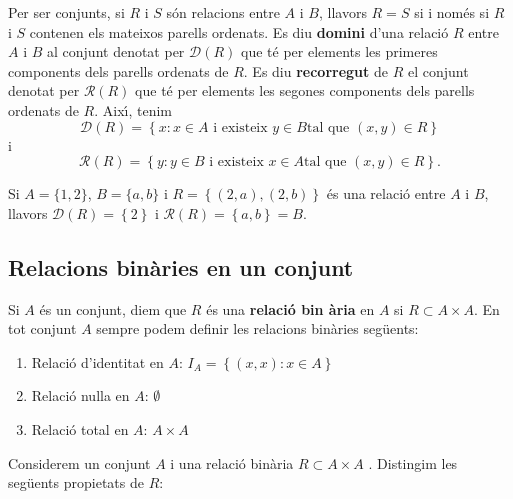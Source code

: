 Per ser conjunts, si $R$ i $S$ s\'{o}n relacions entre $A$ i $B$, llavors $%
R=S$ si i nom\'{e}s si $R$ i $S$ contenen els mateixos parells ordenats. Es
diu \textbf{domini} d'una relaci\'{o} $R$ entre $A$ i $B$ al conjunt denotat
per $\mathcal{D}\left( R\right) $ que t\'{e} per elements les primeres
components dels parells ordenats de $R$. Es diu \textbf{recorregut} de $R$
el conjunt denotat per $\mathcal{R}\left( R\right) $ que t\'{e} per elements
les segones components dels parells ordenats de $R$. Aix\'{\i}, tenim%
\begin{equation*}
\mathcal{D}\left( R\right) =\left\{ x:x\in A\text{ i existeix }y\in B\text{
tal que }(x,y)\in R\right\}
\end{equation*}
i%
\begin{equation*}
\mathcal{R}\left( R\right) =\left\{ y:y\in B\text{ i existeix }x\in A\text{
tal que }(x,y)\in R\right\} \text{.}
\end{equation*}

\begin{exemple}
Si $A=\{1,2\}$, $B=\{a,b\}$ i $R=\left\{ (2,a),(2,b)\right\} $ \'{e}s una
relaci\'{o} entre $A$ i $B$, llavors $\mathcal{D}\left( R\right) =\left\{
2\right\} $ i $\mathcal{R}\left( R\right) =\left\{ a,b\right\} =B$.
\end{exemple}

\subsection{Relacions bin\`{a}ries en un conjunt}

Si $A$ \'{e}s un conjunt, diem que $R$ \'{e}s una \textbf{relaci\'{o} bin%
\`{a}ria} en $A$ si $R\subset A\times A$. En tot conjunt $A$ sempre podem
definir les relacions bin\`{a}ries seg\"{u}ents:

\begin{enumerate}
\item Relaci\'{o} d'identitat en $A$: $I_{A}=\left\{ (x,x):x\in A\right\} $

\item Relaci\'{o} nul\textperiodcentered la en $A$: $\emptyset$

\item Relaci\'{o} total en $A$: $A\times A$
\end{enumerate}

\bigskip

Considerem un conjunt $A$ i una relaci\'{o} bin\`{a}ria $R\subset A\times A$%
. Distingim les seg\"{u}ents propietats de $R$:

